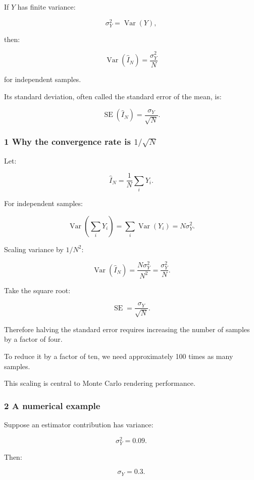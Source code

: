 If \(Y\) has finite variance:

\[
 \sigma_Y^2=\operatorname{Var}(Y),
\]

then:

\[
 \boxed{ \operatorname{Var}(\widehat I_N) = \frac{\sigma_Y^2}{N} }
\]

for independent samples.

Its standard deviation, often called the standard error of the mean, is:

\[
 \boxed{ \operatorname{SE}(\widehat I_N) = \frac{\sigma_Y}{\sqrt N} }.
\]

\subsubsection{\texorpdfstring{1 Why the convergence rate is \(1/\sqrt N\)}{1 Why the convergence rate is 1/\textbackslash sqrt N}}\label{02-foundations-ii-ch030-why-the-convergence-rate-is-1sqrt-n}

Let:

\[
 \widehat I_N= \frac1N\sum_iY_i.
\]

For independent samples:

\[
 \operatorname{Var}\left(\sum_iY_i\right) = \sum_i\operatorname{Var}(Y_i) =N\sigma_Y^2.
\]

Scaling variance by \(1/N^2\):

\[
 \operatorname{Var}(\widehat I_N) = \frac{N\sigma_Y^2}{N^2} = \frac{\sigma_Y^2}{N}.
\]

Take the square root:

\[
 \operatorname{SE}= \frac{\sigma_Y}{\sqrt N}.
\]

Therefore halving the standard error requires increasing the number of samples by a factor of four.

To reduce it by a factor of ten, we need approximately 100 times as many samples.

This scaling is central to Monte Carlo rendering performance.

\subsubsection{2 A numerical example}\label{02-foundations-ii-ch030-a-numerical-example}

Suppose an estimator contribution has variance:

\[
 \sigma_Y^2=0.09.
\]

Then:

\[
 \sigma_Y=0.3.
\]

